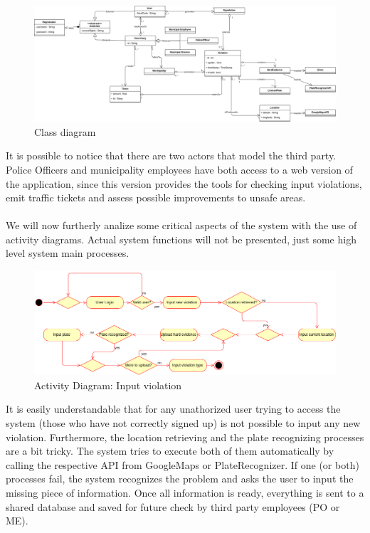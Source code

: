 \documentclass{article}
\begin{document}
\begin{figure}[H]
    \centering
    \includegraphics[scale=0.255]{Images/umlmodel}
    \caption{Class diagram}
\end{figure}

It is possible to notice that there are two actors that model the third party.
Police Officers and municipality employees have both access to a web version of
the application, since this version provides the tools for checking input
violations, emit traffic tickets and assess possible improvements to unsafe
areas.\\
\\
We will now furtherly analize some critical aspects of the system with the use
of activity diagrams. Actual system functions will not be presented, just some
high level system main processes.

\begin{figure}[H]
    \centering
    \includegraphics[scale=0.36]{Images/ActivityInputViolation}
    \caption{Activity Diagram: Input violation}
\end{figure}

It is easily understandable that for any unathorized user trying to access the
system (those who have not correctly signed up) is not possible to input any new
violation. Furthermore, the location retrieving and the plate recognizing
processes are a bit tricky. The system tries to execute both of them
automatically by calling the respective API from GoogleMaps or PlateRecognizer.
If one (or both) processes fail, the system recognizes the problem and asks the
user to input the missing piece of information. Once all information is ready,
everything is sent to a shared database and saved for future check by third
party employees (PO or ME). 
\end{document}
